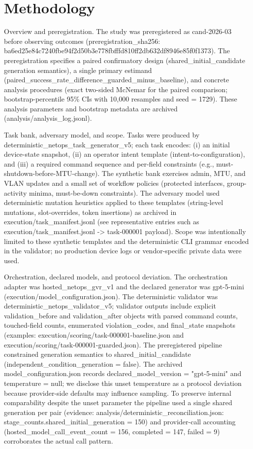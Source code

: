 \documentclass[conference]{IEEEtran}
\begin{document}
\section{Methodology}
Overview and preregistration. The study was preregistered as cand-2026-03 before observing outcomes (preregistration\_sha256: ba6ed25e\allowbreak{}84c7240f\allowbreak{}be94f2d5\allowbreak{}0b3e778f\allowbreak{}bfffd810\allowbreak{}ff2db632\allowbreak{}df8946e8\allowbreak{}5f0f1373). The preregistration specifies a paired confirmatory design (shared\_initial\_candidate generation semantics), a single primary estimand (paired\_success\_rate\_difference\_guarded\_minus\_baseline), and concrete analysis procedures (exact two-sided McNemar for the paired comparison; bootstrap-percentile 95\% CIs with 10,000 resamples and seed = 1729). These analysis parameters and bootstrap metadata are archived (analysis/analysis\_log.jsonl).

Task bank, adversary model, and scope. Tasks were produced by deterministic\_netops\_task\_generator\_v5; each task encodes: (i) an initial device-state snapshot, (ii) an operator intent template (intent-to-configuration), and (iii) a required command sequence and per-field constraints (e.g., must-shutdown-before-MTU-change). The synthetic bank exercises admin, MTU, and VLAN updates and a small set of workflow policies (protected interfaces, group-activity minima, must-be-down constraints). The adversary model used deterministic mutation heuristics applied to these templates (string-level mutations, slot-overrides, token insertions) as archived in execution/task\_manifest.jsonl (see representative entries such as execution/task\_manifest.jsonl -> task-000001 payload). Scope was intentionally limited to these synthetic templates and the deterministic CLI grammar encoded in the validator; no production device logs or vendor-specific private data were used.

Orchestration, declared models, and protocol deviation. The orchestration adapter was hosted\_netops\_gvr\_v1 and the declared generator was gpt-5-mini (execution/model\_configuration.json). The deterministic validator was deterministic\_netops\_validator\_v5; validator outputs include explicit validation\_before and validation\_after objects with parsed command counts, touched-field counts, enumerated violation\_codes, and final\_state snapshots (examples: execution/scoring/task-000001-baseline.json and execution/scoring/task-000001-guarded.json). The preregistered pipeline constrained generation semantics to shared\_initial\_candidate (independent\_condition\_generation = false). The archived model\_configuration.json records declared\_model\_version = "gpt-5-mini" and temperature = null; we disclose this unset temperature as a protocol deviation because provider-side defaults may influence sampling. To preserve internal comparability despite the unset parameter the pipeline used a single shared generation per pair (evidence: analysis/deterministic\_reconciliation.json: stage\_counts.shared\_initial\_generation = 150) and provider-call accounting (hosted\_model\_call\_event\_count = 156, completed = 147, failed = 9) corroborates the actual call pattern.
\end{document}
